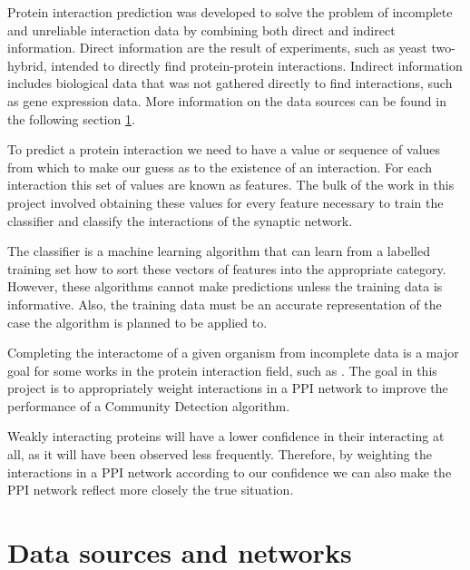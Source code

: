 Protein interaction prediction was developed to solve the problem of incomplete and unreliable interaction data by combining both direct and indirect information\autocite{qi_learning_2008}.
Direct information are the result of experiments, such as yeast two-hybrid, intended to directly find protein-protein interactions.
Indirect information includes biological data that was not gathered directly to find interactions, such as gene expression data.
More information on the data sources can be found in the following section \ref{back:sources}.

To predict a protein interaction we need to have a value or sequence of values from which to make our guess as to the existence of an interaction.
For each interaction this set of values are known as features.
The bulk of the work in this project involved obtaining these values for every feature necessary to train the classifier and classify the interactions of the synaptic network.

The classifier is a machine learning algorithm that can learn from a labelled training set how to sort these vectors of features into the appropriate category. %
However, these algorithms cannot make predictions unless the training data is informative.
Also, the training data must be an accurate representation of the case the algorithm is planned to be applied to.

Completing the interactome of a given organism from incomplete data is a major goal for some works in the protein interaction field, such as \textcite{rodgers-melnick_predicting_2013}.
The goal in this project is to appropriately weight interactions in a PPI network to improve the performance of a Community Detection algorithm.

Weakly interacting proteins will have a lower confidence in their interacting at all, as it will have been observed less frequently.
Therefore, by weighting the interactions in a PPI network according to our confidence we can also make the PPI network reflect more closely the true situation.

\section{Data sources and networks}
\label{back:sources}

